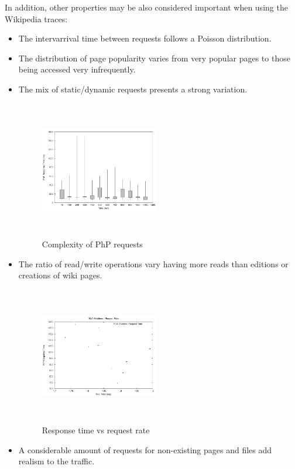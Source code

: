 In addition, other properties may be also considered important when using the Wikipedia traces:

\begin{itemize}
\item The intervarrival time between requests follows a Poisson distribution.

\item The distribution of page popularity varies from very popular pages to those being accessed very infrequently.

\item The mix of static/dynamic requests presents a strong variation. 

\begin{figure}
\begin{center}
\includegraphics[width=0.49\textwidth, height=6cm]{./images/phpRespTimeDispersion}
\end{center}
\caption{Complexity of PhP requests}
\label{phpRespTimeDispersion}
\end{figure}

\item The ratio of read/write operations vary having more reads than editions or creations of wiki pages.

\begin{figure}
\begin{center}
\includegraphics[width=0.49\textwidth, height=6cm]{./images/staticProv_reqRate}
\end{center}
\caption{Response time vs request rate}
\label{reqRate}
\end{figure}

\item A considerable amount of requests for non-existing pages and files add realism to the traffic.

\end{itemize}


